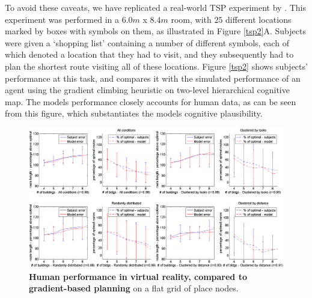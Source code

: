To avoid these caveats, we have replicated a real-world TSP experiment by \citep{Wiener2009}. This experiment was performed in a $6.0m$ x $8.4m$ room, with $25$ different locations marked by boxes with symbols on them, as illustrated in Figure \ref{tsp2}A. Subjects were given a `shopping list' containing a number of different symbols, each of which denoted a location that they had to visit, and they subsequently had to plan the shortest route visiting all of these locations. Figure \ref{tsp2} shows subjects' performance at this task, and compares it with the simulated performance of an agent using the gradient climbing heuristic on two-level hierarchical cognitive map. The models performance closely  accounts for human data, as  can  be  seen  from  this  figure,  which  substantiates  the  models  cognitive plausibility.


\begin{figure}[!ht]
	\begin{center}
		\includegraphics[width=\textwidth]{img/tsperrors2}
	\end{center}
	\caption{
		{\bf Human performance in virtual reality, compared to gradient-based planning} on a flat grid of place nodes. 
	}
	\label{tsp}
\end{figure}


